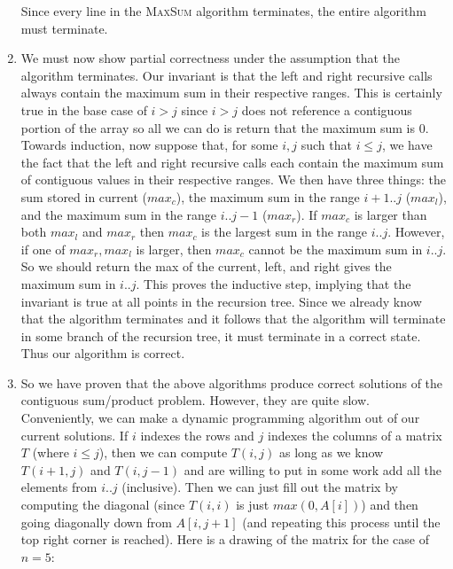 \documentclass{article}
\begin{document}
\begin{enumerate}
        Since every line in the \textsc{MaxSum} algorithm terminates, the entire algorithm must terminate.
    \item We must now show partial correctness under the assumption that the algorithm terminates.
        Our invariant is that the left and right recursive calls always contain the maximum sum in their respective ranges.
        This is certainly true in the base case of $i > j$ since $i > j$ does not reference a contiguous portion of the array so all we can do is return that the maximum sum is 0.
        Towards induction, now suppose that, for some $i,j$ such that $i \leq j$, we have the fact that the left and right recursive calls each contain the maximum sum of contiguous values in their respective ranges.
        We then have three things: the sum stored in current ($max_c$), the maximum sum in the range $i+1..j$ ($max_l$), and the maximum sum in the range $i..j-1$ ($max_r$).
        If $max_c$ is larger than both $max_l$ and $max_r$ then $max_c$ is the largest sum in the range $i..j$.
        However, if one of $max_r, max_l$ is larger, then $max_c$ cannot be the maximum sum in $i..j$.
        So we should return the max of the current, left, and right gives the maximum sum in $i..j$.
        This proves the inductive step, implying that the invariant is true at all points in the recursion tree.
        Since we already know that the algorithm terminates and it follows that the algorithm will terminate in some branch of the recursion tree, it must terminate in a correct state.
        Thus our algorithm is correct.
    \item So we have proven that the above algorithms produce correct solutions of the contiguous sum/product problem.
        However, they are quite slow.
        Conveniently, we can make a dynamic programming algorithm out of our current solutions.
        If $i$ indexes the rows and $j$ indexes the columns of a matrix $T$ (where $i \leq j$), then we can compute $T(i, j)$ as long as we know $T(i+1, j)$ and $T(i, j-1)$ and are willing to put in some work add all the elements from $i..j$ (inclusive).
        Then we can just fill out the matrix by computing the diagonal (since $T(i, i)$ is just $max (0, A[i])$) and then going diagonally down from $A[i, j+1]$ (and repeating this process until the top right corner is reached).
        Here is a drawing of the matrix for the case of $n=5$:
        \newpage
        \begin{figure}
            \begin{center}

\end{center}
\end{figure}
\end{enumerate}
\end{document}
